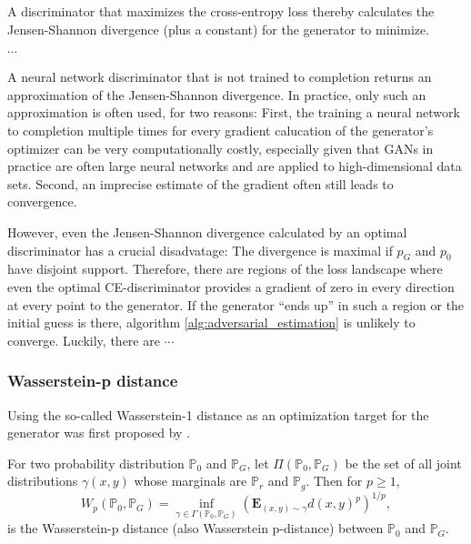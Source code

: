 A discriminator that maximizes the cross-entropy loss thereby calculates the Jensen-Shannon divergence (plus a constant) for the generator to minimize.
\begin{theorem}
    $\cdots$
\end{theorem}
A neural network discriminator that is not trained to completion returns an approximation of the Jensen-Shannon divergence.
In practice, only such an approximation is often used, for two reasons:
First, the training a neural network to completion multiple times for every gradient calucation of the generator's optimizer can be very computationally costly, %
especially given that GANs in practice are often large neural networks and are applied to high-dimensional data sets.
Second, an imprecise estimate of the gradient often still leads to convergence. %

However, even the Jensen-Shannon divergence calculated by an optimal discriminator has a crucial disadvatage:
The divergence is maximal if $p_G$ and $p_0$ have disjoint support. %
Therefore, there are regions of the loss landscape where even the optimal CE-discriminator provides a gradient of zero in every direction at every point to the generator.
If the generator ``ends up'' in such a region or the initial guess is there, algorithm \ref{alg:adversarial_estimation} is unlikely to converge.
Luckily, there are $\cdots$

\subsubsection{Wasserstein-p distance}
\label{sec:wasserstein_loss}

Using the so-called Wasserstein-1 distance as an optimization target for the generator was first proposed by \Textcite{arjovsky2017wassersteingan}.%

\begin{definition}
    For two probability distribution $\mathbb{P}_0$ and $\mathbb{P}_G$, let $\Pi (\mathbb{P}_0, \mathbb{P}_G)$ be the set of all joint distributions $\gamma(x, y)$ whose marginals are $\mathbb{P}_r$ and $\mathbb{P}_g$.
    Then for $p \geq 1$,%
    $$
    W_p(\mathbb{P}_0, \mathbb{P}_G) = \inf_{\gamma \in \Gamma(\mathbb{P}_0, \mathbb{P}_G)} \left(\mathbf{E}_{(x, y) \sim \gamma} d(x, y)^p \right)^{1/p},
    $$
    is the Wasserstein-p distance (also Wasserstein p-distance) between $\mathbb{P}_0$ and $\mathbb{P}_G$.
\end{definition}

